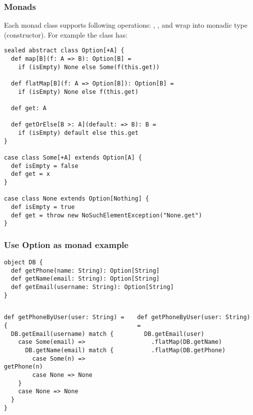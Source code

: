 \begin{frame}[fragile]
\frametitle{Monads}

Each monad class supports following operations: , , and wrap into monadic type (constructor). For example the  class has:

\begin{lstlisting}
sealed abstract class Option[+A] {
  def map[B](f: A => B): Option[B] =
    if (isEmpty) None else Some(f(this.get))

  def flatMap[B](f: A => Option[B]): Option[B] =
    if (isEmpty) None else f(this.get)

  def get: A

  def getOrElse[B >: A](default: => B): B =
    if (isEmpty) default else this.get
}

case class Some[+A] extends Option[A] {
  def isEmpty = false
  def get = x
}

case class None extends Option[Nothing] {
  def isEmpty = true
  def get = throw new NoSuchElementException("None.get")
}
\end{lstlisting}

\end{frame}

\begin{frame}[fragile]
\frametitle{Use Option as monad example}

\begin{lstlisting}
object DB {
  def getPhone(name: String): Option[String]
  def getName(email: String): Option[String]
  def getEmail(username: String): Option[String]
}
\end{lstlisting}

\begin{columns}[t]
\begin{column}{0.5\textwidth}
\begin{lstlisting}
def getPhoneByUser(user: String) = {
  DB.getEmail(username) match {
    case Some(email) => 
      DB.getName(email) match {
        case Some(n) => getPhone(n)
        case None => None
    }
    case None => None
  }
}
\end{lstlisting}
\end{column}
\begin{column}{0.5\textwidth}
\begin{lstlisting}
def getPhoneByUser(user: String) =
  DB.getEmail(user)
    .flatMap(DB.getName)
    .flatMap(DB.getPhone)
\end{lstlisting}
\end{column}
\end{columns}

\end{frame}

